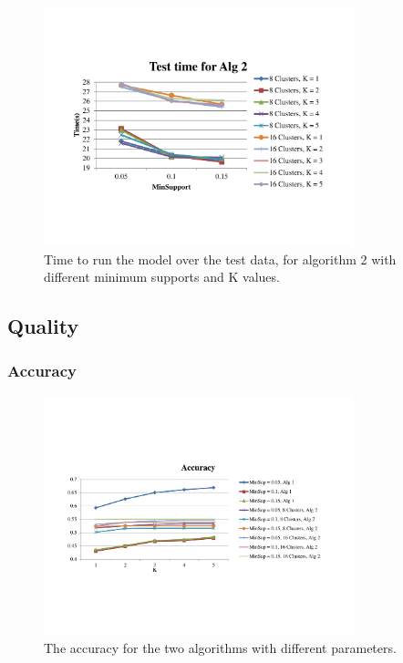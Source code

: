 \begin{figure}
\centering
\includegraphics[width=0.8\textwidth]{TestingTime2}
\caption{\footnotesize Time to run the model over the test data, for algorithm
2 with different minimum supports and K values. }
\label{Fig:TestTime2}
\end{figure}

\subsection{Quality}
\subsubsection{Accuracy}

\begin{figure}
\centering
\includegraphics[width=0.8\textwidth]{Accuracy}
\caption{\footnotesize The accuracy for the two algorithms with different
parameters. }
\label{Fig:Accuracy}
\end{figure}

